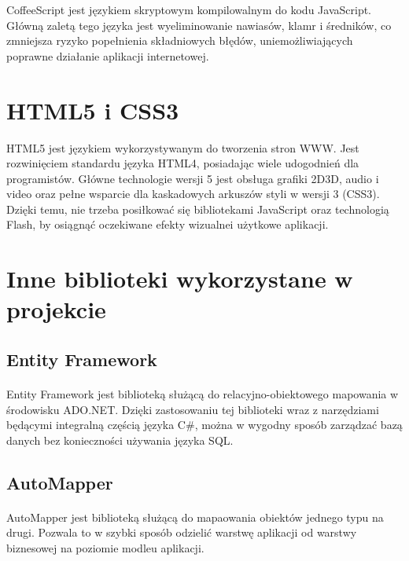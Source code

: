 CoffeeScript jest językiem skryptowym kompilowalnym do kodu JavaScript. Główną zaletą tego języka jest wyeliminowanie nawiasów, klamr i średników, co zmniejsza ryzyko popełnienia składniowych błędów, uniemożliwiających poprawne działanie aplikacji internetowej.

\section{HTML5 i CSS3} %
\label{par:html5_i_css3}

HTML5 jest językiem wykorzystywanym do tworzenia stron WWW. Jest rozwinięciem standardu języka HTML4, posiadając wiele udogodnień dla programistów. Główne technologie wersji 5 jest obsługa grafiki 2D\/3D, audio i video oraz pełne wsparcie dla kaskadowych arkuszów styli w wersji 3 (CSS3). Dzięki temu, nie trzeba posiłkować się bibliotekami JavaScript oraz technologią Flash, by osiągnąć oczekiwane efekty wizualnei użytkowe aplikacji.


\section{Inne biblioteki wykorzystane w projekcie} %
\label{sec:inne_biblioteki_wykorzystane_w_projekcie}

\subsection{Entity Framework} 
\paragraph{}
Entity Framework jest biblioteką służącą do relacyjno-obiektowego mapowania w środowisku ADO.NET. Dzięki zastosowaniu tej biblioteki wraz z narzędziami będącymi integralną częścią języka C\#, można w wygodny sposób zarządzać bazą danych bez konieczności używania języka SQL.

\subsection{AutoMapper} %
\paragraph{} %
\label{par:}

AutoMapper jest biblioteką służącą do mapaowania obiektów jednego typu na drugi. Pozwala to w szybki sposób odzielić warstwę aplikacji od warstwy biznesowej na poziomie modleu aplikacji.
